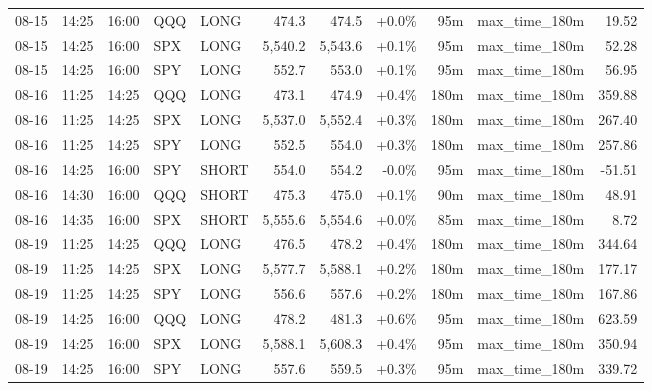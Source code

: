 \documentclass[11pt,a4paper,twoside]{article}
\begin{document}
\begin{center}
\begin{longtable}{>{\color{txtmain}}l l l l l r r r r >{\color{txtmain}}l r}
08-15 & 14:25 & 16:00 & QQQ & LONG & 474.3 & 474.5 & \textcolor{wingreen}{+0.0\%} & 95m & max\_time\_180m & \textcolor{wingreen}{19.52} \\
08-15 & 14:25 & 16:00 & SPX & LONG & 5,540.2 & 5,543.6 & \textcolor{wingreen}{+0.1\%} & 95m & max\_time\_180m & \textcolor{wingreen}{52.28} \\
08-15 & 14:25 & 16:00 & SPY & LONG & 552.7 & 553.0 & \textcolor{wingreen}{+0.1\%} & 95m & max\_time\_180m & \textcolor{wingreen}{56.95} \\
08-16 & 11:25 & 14:25 & QQQ & LONG & 473.1 & 474.9 & \textcolor{wingreen}{+0.4\%} & 180m & max\_time\_180m & \textcolor{wingreen}{359.88} \\
08-16 & 11:25 & 14:25 & SPX & LONG & 5,537.0 & 5,552.4 & \textcolor{wingreen}{+0.3\%} & 180m & max\_time\_180m & \textcolor{wingreen}{267.40} \\
08-16 & 11:25 & 14:25 & SPY & LONG & 552.5 & 554.0 & \textcolor{wingreen}{+0.3\%} & 180m & max\_time\_180m & \textcolor{wingreen}{257.86} \\
08-16 & 14:25 & 16:00 & SPY & SHORT & 554.0 & 554.2 & \textcolor{lossred}{-0.0\%} & 95m & max\_time\_180m & \textcolor{lossred}{-51.51} \\
08-16 & 14:30 & 16:00 & QQQ & SHORT & 475.3 & 475.0 & \textcolor{wingreen}{+0.1\%} & 90m & max\_time\_180m & \textcolor{wingreen}{48.91} \\
08-16 & 14:35 & 16:00 & SPX & SHORT & 5,555.6 & 5,554.6 & \textcolor{wingreen}{+0.0\%} & 85m & max\_time\_180m & \textcolor{wingreen}{8.72} \\
08-19 & 11:25 & 14:25 & QQQ & LONG & 476.5 & 478.2 & \textcolor{wingreen}{+0.4\%} & 180m & max\_time\_180m & \textcolor{wingreen}{344.64} \\
08-19 & 11:25 & 14:25 & SPX & LONG & 5,577.7 & 5,588.1 & \textcolor{wingreen}{+0.2\%} & 180m & max\_time\_180m & \textcolor{wingreen}{177.17} \\
08-19 & 11:25 & 14:25 & SPY & LONG & 556.6 & 557.6 & \textcolor{wingreen}{+0.2\%} & 180m & max\_time\_180m & \textcolor{wingreen}{167.86} \\
08-19 & 14:25 & 16:00 & QQQ & LONG & 478.2 & 481.3 & \textcolor{wingreen}{+0.6\%} & 95m & max\_time\_180m & \textcolor{wingreen}{623.59} \\
08-19 & 14:25 & 16:00 & SPX & LONG & 5,588.1 & 5,608.3 & \textcolor{wingreen}{+0.4\%} & 95m & max\_time\_180m & \textcolor{wingreen}{350.94} \\
08-19 & 14:25 & 16:00 & SPY & LONG & 557.6 & 559.5 & \textcolor{wingreen}{+0.3\%} & 95m & max\_time\_180m & \textcolor{wingreen}{339.72} \\

\end{longtable}
\end{center}
\end{document}
